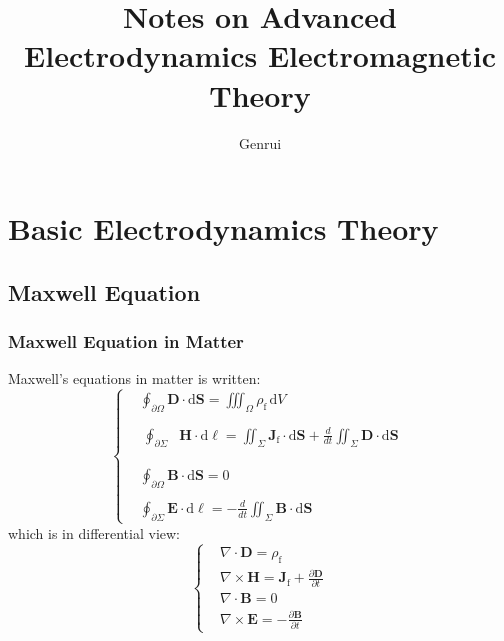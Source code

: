 \documentclass[11pt,a4paper,oneside]{book}
\title{Notes on Advanced Electrodynamics Electromagnetic Theory}
\author{Genrui}
\begin{document}
\maketitle
\tableofcontents
\chapter{Basic Electrodynamics Theory}
\section{Maxwell Equation}


\subsection{Maxwell Equation in Matter}
Maxwell's equations in matter is written:
\begin{equation}\left\{
	\begin{aligned}
		& {\displaystyle \oint_{\partial \Omega} \mathbf {D} \cdot \mathrm {d} \mathbf {S} =\iiint _{\Omega }\rho _{\text{f}}\,\mathrm {d} V}\\ \\
		&{\displaystyle {\begin{aligned}\oint _{\partial \Sigma }&\mathbf {H} \cdot \mathrm {d} {\boldsymbol {\ell }}=\iint _{\Sigma }\mathbf {J} _{\text{f}}\cdot \mathrm {d} \mathbf {S} +{\frac {d}{dt}}\iint _{\Sigma }\mathbf {D} \cdot \mathrm {d} \mathbf {S} \\\end{aligned}}}\\ \\
		&{\displaystyle \oint_{\partial \Omega} \mathbf {B} \cdot \mathrm {d} \mathbf {S} =0}\\ \\
		&{\displaystyle \oint _{\partial \Sigma }\mathbf {E} \cdot \mathrm {d} {\boldsymbol {\ell }}=-{\frac {d}{dt}}\iint _{\Sigma }\mathbf {B} \cdot \mathrm {d} \mathbf {S} }
	\end{aligned}\right.
\end{equation}
which is in differential view:
\begin{equation}\left\{
	\begin{aligned}
		&{\displaystyle \nabla \cdot \mathbf {D} =\rho _{\text{f}}}\\
		&{\displaystyle \nabla \times \mathbf {H} =\mathbf {J} _{\text{f}}+{\frac {\partial \mathbf {D} }{\partial t}}}\\
		&{\displaystyle \nabla \cdot \mathbf {B} =0}\\
		&{\displaystyle \nabla \times \mathbf {E} =-{\frac {\partial \mathbf {B} }{\partial t}}}
	\end{aligned}\right.\label{MxD}
\end{equation}
\end{document}
